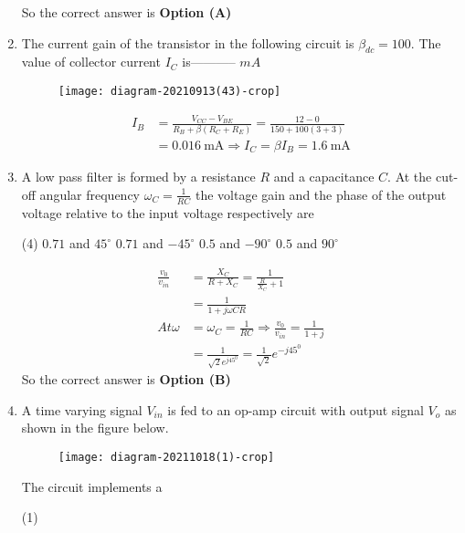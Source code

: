 \begin{enumerate}
\begin{answer}
So the correct answer is \textbf{Option (A)}
\end{answer}
	\item The current gain of the transistor in the following circuit is $\beta_{d c}=100$. The value of collector current $I_{C}$ is----------- $m A$
{	}
\begin{figure}[H]
\centering
\texttt{[image: diagram-20210913(43)-crop]}
\end{figure}
\begin{answer}
\begin{align*}
I_{B}&=\frac{V_{C C}-V_{B E}}{R_{B}+\beta\left(R_{C}+R_{E}\right)}=\frac{12-0}{150+100(3+3)}\\&=0.016 \mathrm{~mA} \Rightarrow I_{C}=\beta I_{B}=1.6 \mathrm{~mA}
\end{align*}
\end{answer}
	\item A low pass filter is formed by a resistance $R$ and a capacitance $C .$ At the cut-off angular frequency $\omega_{C}=\frac{1}{R C}$ the voltage gain and the phase of the output voltage relative to the input voltage respectively are
{	}
\begin{tasks}(4)
\task[\textbf{A.}] $0.71$ and $45^{\circ}$
\task[\textbf{B.}]  $0.71$ and $-45^{\circ}$
\task[\textbf{C.}] $0.5$ and $-90^{\circ}$
\task[\textbf{D.}] $0.5$ and $90^{\circ}$
\end{tasks}
\begin{answer}
\begin{align*}
\frac{v_{0}}{v_{i n}}&=\frac{X_{C}}{R+X_{C}}=\frac{1}{\frac{R}{X_{C}}+1}\\&=\frac{1}{1+j \omega C R}\\
At \omega&=\omega_{C}=\frac{1}{R C} \Rightarrow \frac{v_{0}}{v_{i n}}=\frac{1}{1+j}\\&=\frac{1}{\sqrt{2} e^{j 45^{0}}}=\frac{1}{\sqrt{2}} e^{-j 45^{0}}
\end{align*}
So the correct answer is \textbf{Option (B)}
\end{answer}
	\item A time varying signal $V_{i n}$ is fed to an op-amp circuit with output signal $V_{o}$ as shown in the figure below.\\
	\begin{figure}[H]
		\centering
		\texttt{[image: diagram-20211018(1)-crop]}
	\end{figure}
	The circuit implements a
{	}
\begin{tasks}(1)

\end{tasks}
\end{enumerate}
